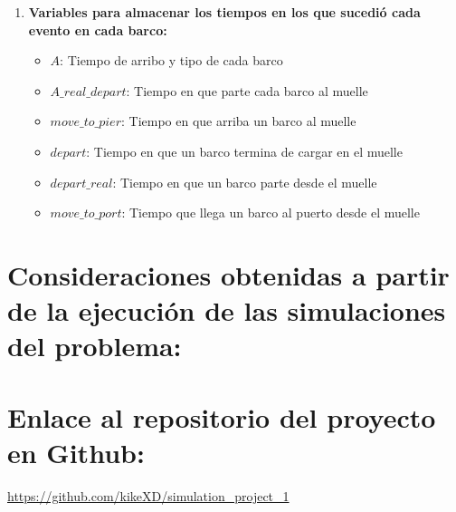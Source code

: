 \documentclass[titlepage,11pt]{scrartcl}
\begin{document}
\begin{enumerate}
\begin{itemize}
			\end{itemize}
		\item \textbf{Variables para almacenar los tiempos en los que sucedió cada evento en cada barco:}
			\begin{itemize}
				\item $A$: Tiempo de arribo y tipo de cada barco
    			\item $A\_real\_depart$: Tiempo en que parte cada barco al muelle
    			\item $move\_to\_pier$: Tiempo en que arriba un barco al muelle
    			\item $depart$: Tiempo en que un barco termina de cargar en el muelle
    			\item $depart\_real$: Tiempo en que un barco parte desde el muelle
    			\item $move\_to\_port$: Tiempo que llega un barco al puerto desde el muelle
			\end{itemize}
	\end{enumerate}

	 

\section{Consideraciones obtenidas a partir de la ejecución de las simulaciones del
problema:}

\section{Enlace al repositorio del proyecto en Github:}
	\url{https://github.com/kikeXD/simulation_project_1}
\end{document}
